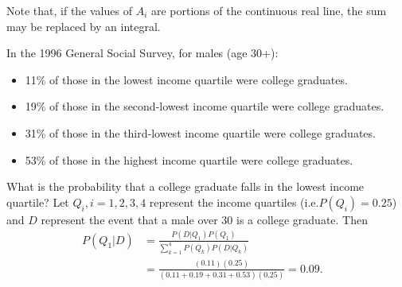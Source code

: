 Note that, if the values of $A_{i}$ are portions of the continuous real line, the sum may be replaced by an integral.
\begin{Example}
In the 1996 General Social Survey, for males (age 30+):
\begin{itemize}[noitemsep]
\item 11\% of those in the lowest income quartile were college graduates.
\item 19\% of those in the second-lowest income quartile were college graduates.
\item 31\% of those in the third-lowest income quartile were college graduates.
\item 53\% of those in the highest income quartile were college graduates.
\end{itemize}
What is the probability that a college graduate falls in the lowest income quartile? 
\newl Let $Q_{i}, i =1, 2, 3, 4$ represent the income quartiles (i.e.\@ $P(Q_{i}) =0.25$) and $D$ represent the event that a male over 30 is a college graduate. Then
\begin{equation*}
\begin{aligned}
P( Q_{1}|D )&= \frac{P(D|Q_{1}) P(Q_{1})}{\sum^{4}_{k=1} P(Q_{k}) P(D|Q_{k})}  & \\
            &= \frac{(0.11)(0.25)}{(0.11+0.19+0.31+0.53)(0.25)} = 0.09.&
\end{aligned}
\end{equation*}
\end{Example}
